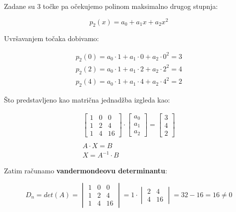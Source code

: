 \begin{multicols}{2}

Zadane su 3 točke pa očekujemo polinom maksimalno drugog stupnja:

$$
    p_2(x) = a_0 + a_1x + a_2x^2
$$

Uvršavanjem točaka dobivamo:

\begin{gather*}
p_2(0) = a_0\cdot 1 + a_1\cdot 0 + a_2\cdot 0^2 = 3\\
p_2(2) = a_0\cdot 1 + a_1\cdot 2 + a_2\cdot 2^2 = 4\\
p_2(4) = a_0\cdot 1 + a_1\cdot 4 + a_2\cdot 4^2 = 2
\end{gather*}

\newcolumn

Što predstavljeno kao matrična jednadžba izgleda kao:

\begin{gather*}
\begin{bmatrix}
1 & 0 & 0 \\
1 & 2 & 4 \\
1 & 4 & 16
\end{bmatrix}
\cdot
\begin{bmatrix}
a_0 \\ a_1 \\ a_2
\end{bmatrix}
=
\begin{bmatrix}
3 \\ 4 \\ 2
\end{bmatrix} \\\\
A\cdot X = B \\
X = A^{-1} \cdot B
\end{gather*}

\end{multicols}

Zatim računamo \textbf{vandermondeovu determinantu}:

$$
D_n =
det(A) =
\begin{vmatrix}
1 & 0 & 0 \\
1 & 2 & 4 \\
1 & 4 & 16
\end{vmatrix}
= 1 \cdot
\begin{vmatrix}
2 & 4 \\
4 & 16
\end{vmatrix}
= 32 - 16 = 16 \neq 0
$$

